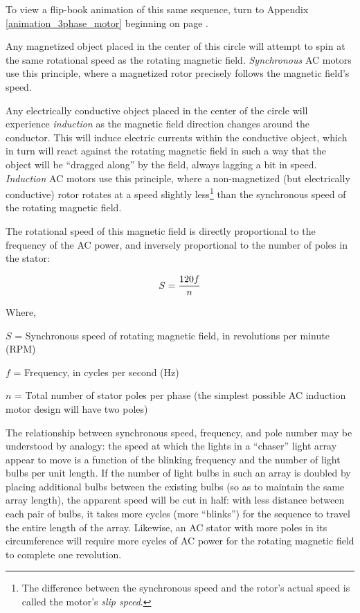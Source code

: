 To view a flip-book animation of this same sequence, turn to Appendix \ref{animation_3phase_motor} beginning on page \pageref{animation_3phase_motor}.

Any magnetized object placed in the center of this circle will attempt to spin at the same rotational speed as the rotating magnetic field.  \textit{Synchronous} AC motors use this principle, where a magnetized rotor precisely follows the magnetic field's speed.  

Any electrically conductive object placed in the center of the circle will experience \textit{induction} as the magnetic field direction changes around the conductor.  This will induce electric currents within the conductive object, which in turn will react against the rotating magnetic field in such a way that the object will be ``dragged along'' by the field, always lagging a bit in speed.  \textit{Induction} AC motors use this principle, where a non-magnetized (but electrically conductive) rotor rotates at a speed slightly less\footnote{The difference between the synchronous speed and the rotor's actual speed is called the motor's \textit{slip speed}.} than the synchronous speed of the rotating magnetic field.      

\filbreak

The rotational speed of this magnetic field is directly proportional to the frequency of the AC power, and inversely proportional to the number of poles in the stator:

$$S = {120 f \over n}$$

\noindent
Where,

$S$ = Synchronous speed of rotating magnetic field, in revolutions per minute (RPM)

$f$ = Frequency, in cycles per second (Hz)

$n$ = Total number of stator poles per phase (the simplest possible AC induction motor design will have two poles)

\vskip 10pt

The relationship between synchronous speed, frequency, and pole number may be understood by analogy: the speed at which the lights in a ``chaser'' light array appear to move is a function of the blinking frequency and the number of light bulbs per unit length.  If the number of light bulbs in such an array is doubled by placing additional bulbs between the existing bulbs (so as to maintain the same array length), the apparent speed will be cut in half: with less distance between each pair of bulbs, it takes more cycles (more ``blinks'') for the sequence to travel the entire length of the array.  Likewise, an AC stator with more poles in its circumference will require more cycles of AC power for the rotating magnetic field to complete one revolution.

